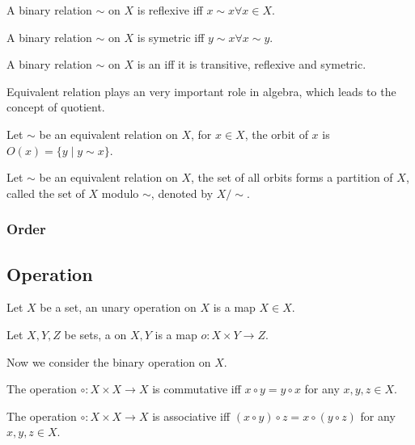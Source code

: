 \begin{defi}[reflexive]
A binary relation $\sim$ on $X$ is reflexive iff $x \sim x \forall x \in X$.
\end{defi}

\begin{defi}[symetric]
A binary relation $\sim$ on $X$ is symetric iff $y \sim x \forall x \sim y$.
\end{defi}

\begin{defi}
A binary relation $\sim$ on $X$ is an  iff it is transitive,
reflexive and symetric.
\end{defi}

Equivalent relation plays an very important role in algebra, which leads to the
concept of quotient.

\begin{defi}[orbit]
Let $\sim$ be an equivalent relation on $X$, for $x \in X$, the orbit of $x$ is
$O(x) = \{y \mid y \sim x\}$.
\end{defi}

\begin{defi}[quotient]
Let $\sim$ be an equivalent relation on $X$, the set of all orbits forms a partition
of $X$, called the  set of $X$ modulo $\sim$, denoted by $X / \sim$.
\end{defi}

\subsubsection{Order}

\subsection{Operation}
\begin{defi}
Let $X$ be a set, an unary operation on $X$ is a map $X \in X$.
\end{defi}

\begin{defi}
Let $X, Y, Z$ be sets, a  on $X, Y$ is a map $o : X \times Y \to Z$.
\end{defi}

Now we consider the binary operation on $X$.

\begin{defi}
The operation $\circ : X \times X \to X$ is commutative iff $x \circ y = y \circ x$
for any $x, y, z \in X$.
\end{defi}

\begin{defi}
The operation $\circ : X \times X \to X$ is associative iff $(x \circ y) \circ z = x \circ (y \circ z)$
for any $x, y, z \in X$.
\end{defi}
